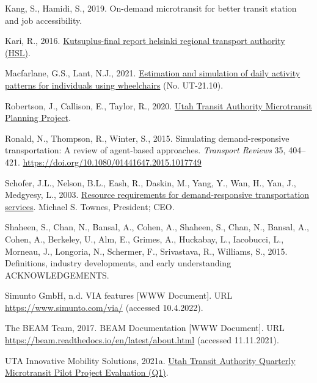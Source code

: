 \documentclass[
]{article}
\newlength{\cslhangindent}
\newlength{\cslentryspacingunit} %
\newenvironment{CSLReferences}[2] %
 {%
  \setlength{\parindent}{0pt}
  \ifodd #1
  \let\oldpar\par
  \def\par{\hangindent=\cslhangindent\oldpar}
  \fi
  \setlength{\parskip}{#2\cslentryspacingunit}
 }%
 {}
\begin{document}
\begin{CSLReferences}{1}{0}
\leavevmode{}%
Kang, S., Hamidi, S., 2019. On-demand microtransit for better transit station and job accessibility.

\leavevmode{}%
Kari, R., 2016. \href{https://www.hsl.fi}{Kutsuplus-final report helsinki regional transport authority (HSL)}.

\leavevmode{}%
Macfarlane, G.S., Lant, N.J., 2021. \href{https://rosap.ntl.bts.gov/view/dot/56982}{Estimation and simulation of daily activity patterns for individuals using wheelchairs} (No. UT-21.10).

\leavevmode{}%
Robertson, J., Callison, E., Taylor, R., 2020. \href{https://www.rideuta.com/-/media/Files/About-UTA/Reports/2021/UTA_Microtransit_Consulting_Report_Final.ashx?la=en}{{Utah Transit Authority Microtransit Planning Project}}.

\leavevmode{}%
Ronald, N., Thompson, R., Winter, S., 2015. Simulating demand-responsive transportation: A review of agent-based approaches. \emph{Transport Reviews} 35, 404--421. \url{https://doi.org/10.1080/01441647.2015.1017749}

\leavevmode{}%
Schofer, J.L., Nelson, B.L., Eash, R., Daskin, M., Yang, Y., Wan, H., Yan, J., Medgyesy, L., 2003. \href{http://www.national-academies.org/trb/bookstore}{Resource requirements for demand-responsive transportation services}. Michael S. Townes, President; CEO.

\leavevmode{}%
Shaheen, S., Chan, N., Bansal, A., Cohen, A., Shaheen, S., Chan, N., Bansal, A., Cohen, A., Berkeley, U., Alm, E., Grimes, A., Huckabay, L., Iacobucci, L., Morneau, J., Longoria, N., Schermer, F., Srivastava, R., Williams, S., 2015. Definitions, industry developments, and early understanding ACKNOWLEDGEMENTS.

\leavevmode{}%
Simunto GmbH, n.d. VIA features {[}WWW Document{]}. URL \url{https://www.simunto.com/via/} (accessed 10.4.2022).

\leavevmode{}%
The BEAM Team, 2017. {BEAM Documentation} {[}WWW Document{]}. URL \url{https://beam.readthedocs.io/en/latest/about.html} (accessed 11.11.2021).

\leavevmode{}%
UTA Innovative Mobility Solutions, 2021a. \href{https://www.rideuta.com/-/media/Files/Services/Via/Final_UTA_microtransit_pilot_Q1_report.ashx?la=en}{{Utah Transit Authority Quarterly Microtransit Pilot Project Evaluation (Q1)}}.


\end{CSLReferences}
\end{document}
